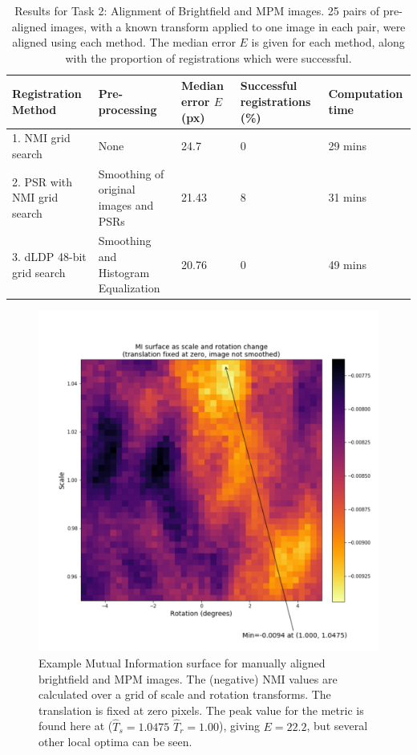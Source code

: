 \documentclass{report}
\begin{document}
\begin{table}
\centering
\begin{tabular}{|p{1.2in}|p{1.05in}|p{0.6in}|p{0.9in}|p{0.9in}|}
\hline
\textbf{Registration Method} & \textbf{Pre-processing} & \textbf{Median error $E$ (px)} & \textbf{Successful registrations (\%)} & \textbf{Computation time} \\
\hline
\hline
1. NMI grid search & None & 24.7 & 0 & 29 mins \\
\hline
2. PSR with NMI grid search & Smoothing of original images and PSRs & 21.43 & 8 & 31 mins \\
\hline
3. dLDP 48-bit grid search & Smoothing and Histogram Equalization & 20.76 & 0 & 49 mins \\
\hline
\end{tabular}
\caption{Results for Task 2: Alignment of Brightfield and MPM images. 25 pairs of pre-aligned images, with a known transform applied to one image in each pair, were aligned using each method. The median error $E$ is given for each method, along with the proportion of registrations which were successful.}
\label{tab:task2results}
\end{table}

\begin{figure}
\centering
\includegraphics[width = 5 in]{MI_blur0_qNone_im11_fig.pdf}

\caption{Example Mutual Information surface for manually aligned brightfield and MPM images. The (negative) NMI values are calculated over a grid of scale and rotation transforms. The translation is fixed at zero pixels.
The peak value for the metric is found here at ($\hat{T}_s = 1.0475$ $\hat{T}_r = 1.00$), giving $E=22.2$, but several other local optima can be seen.
}
\label{fig:bf_mpm_surf}
\end{figure}
\end{document}
